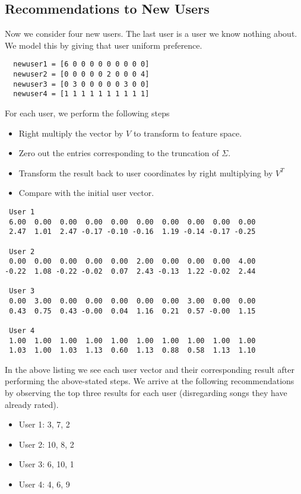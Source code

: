 \documentclass[12pt]{article}
\begin{document}
\subsection{Recommendations to New Users} %
\label{sub:recommendations_to_new_users}
Now we consider four new users. The last user is a user we know nothing about. We model this by giving that user uniform preference.
\begin{verbatim}
  newuser1 = [6 0 0 0 0 0 0 0 0 0]
  newuser2 = [0 0 0 0 0 2 0 0 0 4]
  newuser3 = [0 3 0 0 0 0 0 3 0 0]
  newuser4 = [1 1 1 1 1 1 1 1 1 1] 
\end{verbatim}
\pagebreak
For each user, we perform the following steps
\begin{itemize}
  \item Right multiply the vector by $V$ to transform to feature space.
  \item Zero out the entries corresponding to the truncation of $\Sigma$.
  \item Transform the result back to user coordinates by right multiplying by $V^T$
  \item Compare with the initial user vector.
\end{itemize}

\begin{lstlisting}
 User 1
 6.00  0.00  0.00  0.00  0.00  0.00  0.00  0.00  0.00  0.00
 2.47  1.01  2.47 -0.17 -0.10 -0.16  1.19 -0.14 -0.17 -0.25
 
 User 2
 0.00  0.00  0.00  0.00  0.00  2.00  0.00  0.00  0.00  4.00
-0.22  1.08 -0.22 -0.02  0.07  2.43 -0.13  1.22 -0.02  2.44

 User 3
 0.00  3.00  0.00  0.00  0.00  0.00  0.00  3.00  0.00  0.00
 0.43  0.75  0.43 -0.00  0.04  1.16  0.21  0.57 -0.00  1.15
 
 User 4
 1.00  1.00  1.00  1.00  1.00  1.00  1.00  1.00  1.00  1.00
 1.03  1.00  1.03  1.13  0.60  1.13  0.88  0.58  1.13  1.10
\end{lstlisting}
In the above listing we see each user vector and their corresponding result after performing the above-stated steps. We arrive at the following recommendations by observing the top three results for each user (disregarding songs they have already rated).
\begin{itemize}
  \item User 1: 3, 7, 2
  \item User 2: 10, 8, 2
  \item User 3: 6, 10, 1
  \item User 4: 4, 6, 9
\end{itemize}
\pagebreak
\end{document}
